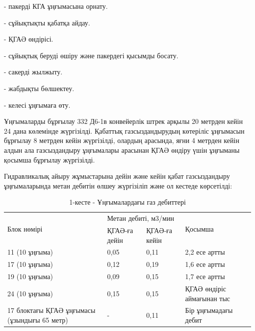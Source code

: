 \begin{multicols}{2}
- пакерді КГА ұңғымасына орнату.

- сұйықтықты қабатқа айдау.

- ҚГАӘ өндірісі.

- сұйықтық беруді өшіру және пакердегі қысымды босату.

- сакерді жылжыту.

- жабдықты бөлшектеу.

- келесі ұңғымаға өту.

Ұңғымаларды бұрғылау 332 Д6-1в конвейерлік штрек арқылы 20 метрден кейін
24 дана көлемінде жүргізілді. Қабаттық газсыздандырудың көтеріліс
ұңғымасын бұрғылау 8 метрден кейін жүргізілді, олардың арасында, яғни 4
метрден кейін алдын ала газсыздандыру ұңғымалары арасынан ҚГАӘ өндіру
үшін ұңғыманы қосымша бұрғылау жүргізілді.

Гидравликалық айыру жұмыстарына дейін және кейін қабат газсыздандыру
ұңғымаларында метан дебитін өлшеу жүргізіліп және ол кестеде көрсетілді:
\end{multicols}

\begin{table}[H]
\caption*{1-кесте - Ұңғымалардағы газ дебиттері}
\centering
\begin{tabular}{|p{}|ll|l|}
\hline
\multirow{2}{=}{Блок нөмірі} & \multicolumn{2}{l|}{Метан дебиті, м3/мин} & \multirow{2}{*}{Қосымша} \\ \cline{2-3}
 & \multicolumn{1}{l|}{ҚГАӘ-ға дейін} & ҚГАӘ-ға кейін &  \\ \hline
11 (10 ұңғыма) & \multicolumn{1}{l|}{0,05} & 0,11 & 2,2 есе артты \\ \hline
17 (10 ұңғыма) & \multicolumn{1}{l|}{0,12} & 0,19 & 1,6 есе артты \\ \hline
19 (10 ұңғыма) & \multicolumn{1}{l|}{0,09} & 0,15 & 1,7 есе артты \\ \hline
24 (10 ұңғыма) & \multicolumn{1}{l|}{0,15} & 0,15 & ҚГАӘ өндіріс аймағынан тыс \\ \hline
17 блоктағы ҚГАӘ ұңғымасы (ұзындығы 65 метр) & \multicolumn{1}{l|}{-} & 0,11 & Бір ұңғымадағы дебит \\ \hline
\end{tabular}
\end{table}

